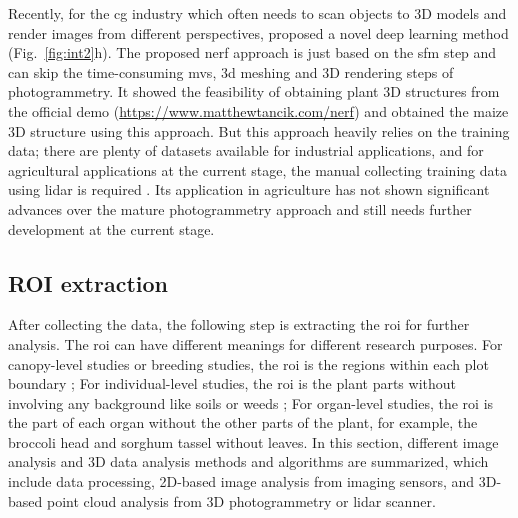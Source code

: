 

Recently, for the \gls{cg} industry which often needs to scan objects to 3D models and render images from different perspectives, \citet{mildenhall_nerf_2022} proposed a novel deep learning method (Fig.~\ref{fig:int2}h). The proposed \gls{nerf} approach is just based on the \gls{sfm} step and can skip the time-consuming \gls{mvs}, 3d meshing and 3D rendering steps of photogrammetry. It showed the feasibility of obtaining plant 3D structures from the official demo (\url{https://www.matthewtancik.com/nerf}) and \citet{jignasu_plant_2023} obtained the maize 3D structure using this approach. But this approach heavily relies on the training data; there are plenty of datasets available for industrial applications, and for agricultural applications at the current stage, the manual collecting training data using \gls{lidar} is required \citep{jignasu_plant_2023}. Its application in agriculture has not shown significant advances over the mature photogrammetry approach and still needs further development at the current stage.



\subsection{ROI extraction}

After collecting the data, the following step is extracting the \acrfull{roi} for further analysis. The \gls{roi} can have different meanings for different research purposes. For canopy-level studies or breeding studies, the \gls{roi} is the regions within each plot boundary \citep{trevisan_htp_2020, han_drone_2021}; For individual-level studies, the \gls{roi} is the plant parts without involving any background like soils or weeds \citep{ge_method_2019,guo_fieldbased_2020}; For organ-level studies, the \gls{roi} is the part of each organ without the other parts of the plant, for example, the broccoli head \citep{zhou_monitoring_2020} and sorghum tassel \citep{ghosal_weakly_2019} without leaves. In this section, different image analysis and 3D data analysis methods and algorithms are summarized, which include data processing, 2D-based image analysis from imaging sensors, and 3D-based point cloud analysis from 3D photogrammetry or \gls{lidar} scanner.

